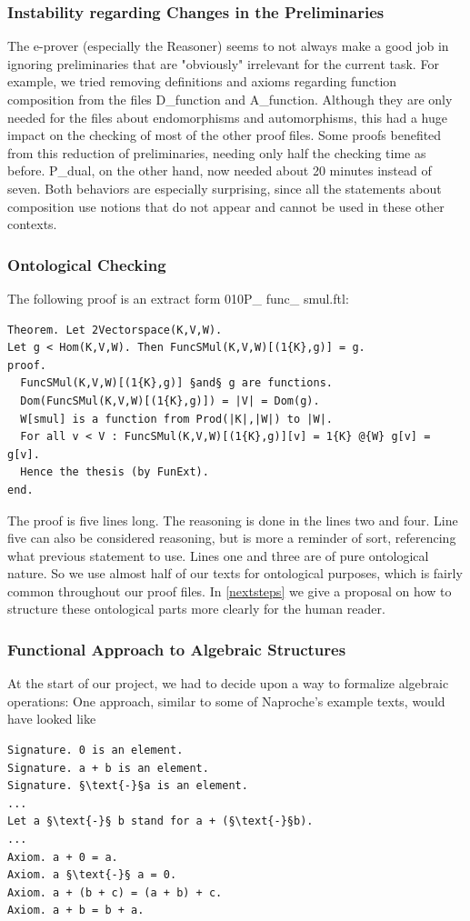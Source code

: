 \documentclass[11pt]{article}
\begin{document}
\subsubsection{Instability regarding Changes in the Preliminaries} \label{instabilites}
The e-prover (especially the Reasoner) seems to not always make a good job in ignoring preliminaries that are "obviously" irrelevant for the current task.
For example, we tried removing definitions and axioms regarding function composition from the files D\_function and A\_function. Although they are only needed for the files about endomorphisms and automorphisms, this had a huge impact on the checking of most of the other proof files.
Some proofs benefited from this reduction of preliminaries, needing only half the checking time as before.
P\_dual, on the other hand, now needed about 20 minutes instead of seven.
Both behaviors are especially surprising, since all the statements about composition use notions that do not appear and cannot be used in these other contexts.


\subsubsection{Ontological Checking} \label{ontologialChecking}
The following proof is an extract form 010P\_ func\_ smul.ftl:
\begin{lstlisting}
Theorem. Let 2Vectorspace(K,V,W).
Let g < Hom(K,V,W). Then FuncSMul(K,V,W)[(1{K},g)] = g.
proof.
  FuncSMul(K,V,W)[(1{K},g)] §and§ g are functions.
  Dom(FuncSMul(K,V,W)[(1{K},g)]) = |V| = Dom(g).
  W[smul] is a function from Prod(|K|,|W|) to |W|.
  For all v < V : FuncSMul(K,V,W)[(1{K},g)][v] = 1{K} @{W} g[v] = g[v].
  Hence the thesis (by FunExt).
end.
\end{lstlisting}
The proof is five lines long. The reasoning is done in the lines two and four. Line five can also be considered reasoning, but is more a reminder of sort, referencing what previous statement to use. Lines one and three are of pure ontological nature. So we use almost half of our texts for ontological purposes, which is fairly common throughout our proof files. In \ref{nextsteps} we give a proposal on how to structure these ontological parts more clearly for the human reader.


\subsubsection{Functional Approach to Algebraic Structures} \label{functionalapproach}
At the start of our project, we had to decide upon a way to formalize algebraic operations:
One approach, similar to some of Naproche's example texts, would have looked like
\begin{lstlisting}
Signature. 0 is an element.
Signature. a + b is an element.
Signature. §\text{-}§a is an element.
...
Let a §\text{-}§ b stand for a + (§\text{-}§b).
...
Axiom. a + 0 = a.
Axiom. a §\text{-}§ a = 0.
Axiom. a + (b + c) = (a + b) + c.
Axiom. a + b = b + a.
\end{lstlisting}
\end{document}
